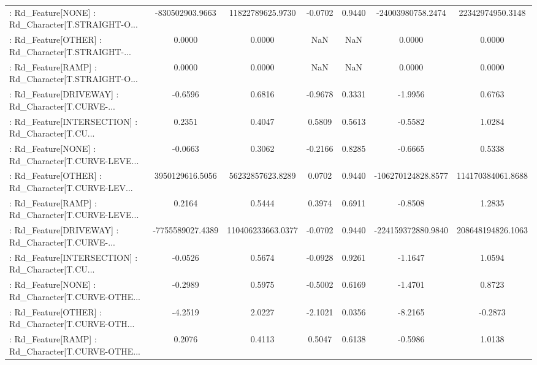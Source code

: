 \begin{longtable}{p{4cm}cccccc}
 : Rd\_Feature[NONE] : Rd\_Character[T.STRAIGHT-O... &   -830502903.9663 &  11822789625.9730 & -0.0702 &       0.9440 &  -24003980758.2474 &  22342974950.3148 \\
 : Rd\_Feature[OTHER] : Rd\_Character[T.STRAIGHT-... &            0.0000 &            0.0000 &     NaN &          NaN &             0.0000 &            0.0000 \\
 : Rd\_Feature[RAMP] : Rd\_Character[T.STRAIGHT-O... &            0.0000 &            0.0000 &     NaN &          NaN &             0.0000 &            0.0000 \\
 : Rd\_Feature[DRIVEWAY] : Rd\_Character[T.CURVE-... &           -0.6596 &            0.6816 & -0.9678 &       0.3331 &            -1.9956 &            0.6763 \\
 : Rd\_Feature[INTERSECTION] : Rd\_Character[T.CU... &            0.2351 &            0.4047 &  0.5809 &       0.5613 &            -0.5582 &            1.0284 \\
 : Rd\_Feature[NONE] : Rd\_Character[T.CURVE-LEVE... &           -0.0663 &            0.3062 & -0.2166 &       0.8285 &            -0.6665 &            0.5338 \\
 : Rd\_Feature[OTHER] : Rd\_Character[T.CURVE-LEV... &   3950129616.5056 &  56232857623.8289 &  0.0702 &       0.9440 & -106270124828.8577 & 114170384061.8688 \\
 : Rd\_Feature[RAMP] : Rd\_Character[T.CURVE-LEVE... &            0.2164 &            0.5444 &  0.3974 &       0.6911 &            -0.8508 &            1.2835 \\
 : Rd\_Feature[DRIVEWAY] : Rd\_Character[T.CURVE-... &  -7755589027.4389 & 110406233663.0377 & -0.0702 &       0.9440 & -224159372880.9840 & 208648194826.1063 \\
 : Rd\_Feature[INTERSECTION] : Rd\_Character[T.CU... &           -0.0526 &            0.5674 & -0.0928 &       0.9261 &            -1.1647 &            1.0594 \\
 : Rd\_Feature[NONE] : Rd\_Character[T.CURVE-OTHE... &           -0.2989 &            0.5975 & -0.5002 &       0.6169 &            -1.4701 &            0.8723 \\
 : Rd\_Feature[OTHER] : Rd\_Character[T.CURVE-OTH... &           -4.2519 &            2.0227 & -2.1021 &       0.0356 &            -8.2165 &           -0.2873 \\
 : Rd\_Feature[RAMP] : Rd\_Character[T.CURVE-OTHE... &            0.2076 &            0.4113 &  0.5047 &       0.6138 &            -0.5986 &            1.0138 \\

\end{longtable}
